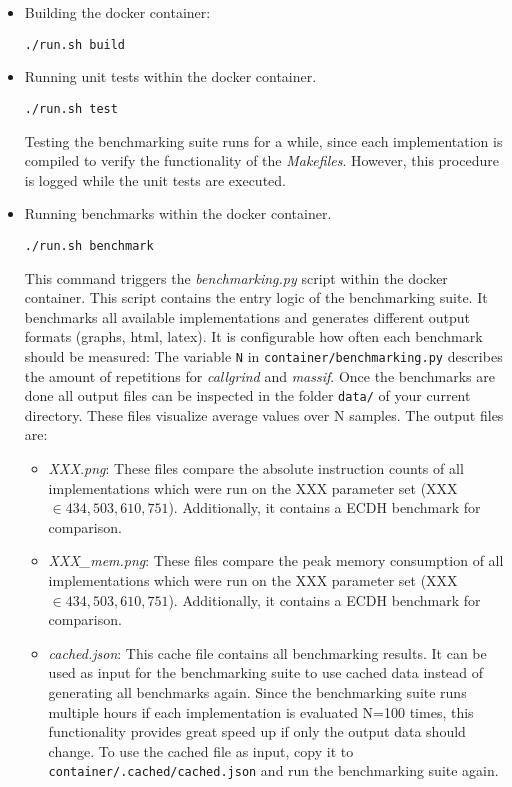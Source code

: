 \begin{itemize}
\itemsep0em 
\item Building the docker container:
\begin{lstlisting}[numbers=none,linewidth=4cm]
./run.sh build
\end{lstlisting}

\item Running unit tests within the docker container.
\begin{lstlisting}[numbers=none,linewidth=4cm]
./run.sh test
\end{lstlisting}
Testing the benchmarking suite runs for a while, since each implementation is compiled to verify the functionality of the \textit{Makefiles}. However, this procedure is logged while the unit tests are executed.

\item Running benchmarks within the docker container.
\begin{lstlisting}[numbers=none,linewidth=4cm]
./run.sh benchmark
\end{lstlisting}
This command triggers the \textit{benchmarking.py} script within the docker container. This script contains the entry logic of the benchmarking suite. It benchmarks all available implementations and generates different output formats (graphs, html, latex). It is configurable how often each benchmark should be measured: The variable \texttt{N} in \texttt{container/benchmarking.py} describes the amount of repetitions for \textit{callgrind} and \textit{massif}. Once the benchmarks are done all output files can be inspected in the folder \texttt{data/} of your current directory. These files visualize average values over N samples. The output files are:
	\begin{itemize}
	\item \textit{XXX.png}: These files compare the absolute instruction counts of all implementations which were run on the XXX parameter set (XXX $\in {434, 503, 610, 751}$). Additionally, it contains a ECDH benchmark for comparison.
	\item \textit{XXX\_mem.png}: These files compare the peak memory consumption of all implementations which were run on the XXX parameter set (XXX $\in {434, 503, 610, 751}$). Additionally, it contains a ECDH benchmark for comparison.

	\item \textit{cached.json}: This cache file contains all benchmarking results. It can be used as input for the benchmarking suite to use cached data instead of generating all benchmarks again. Since the benchmarking suite runs multiple hours if each implementation is evaluated N=100 times, this functionality provides great speed up if only the output data should change. To use the cached file as input, copy it to \texttt{container/.cached/cached.json} and run the benchmarking suite again.
	

\end{itemize}
\end{itemize}
